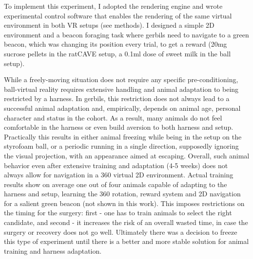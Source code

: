 To implement this experiment, I adopted the rendering engine and wrote experimental control software that enables the rendering of the same virtual environment in both VR setups (see methods). I designed a simple 2D environment and a beacon foraging task where gerbils need to navigate to a green beacon, which was changing its position every trial, to get a reward (20mg sucrose pellets in the ratCAVE setup, a 0.1ml dose of sweet milk in the ball setup).

While a freely-moving situation does not require any specific pre-conditioning, ball-virtual reality requires extensive handling and animal adaptation to being restricted by a harness. In gerbils, this restriction does not always lead to a successful animal adaptation and, empirically, depends on animal age, personal character and status in the cohort. As a result, many animals do not feel comfortable in the harness or even build aversion to both harness and setup. Practically this results in either animal freezing while being in the setup on the styrofoam ball, or a periodic running in a single direction, supposedly ignoring the visual projection, with an appearance aimed at escaping. Overall, such animal behavior even after extensive training and adaptation (4-5 weeks) does not always allow for navigation in a 360 virtual 2D environment. Actual training results show on average one out of four animals capable of adapting to the harness and setup, learning the 360 rotation, reward system and 2D navigation for a salient green beacon (not shown in this work). This imposes restrictions on the timing for the surgery: first - one has to train animals to select the right candidate, and second - it increases the risk of an overall wasted time, in case the surgery or recovery does not go well. Ultimately there was a decision to freeze this type of experiment until there is a better and more stable solution for animal training and harness adaptation.
